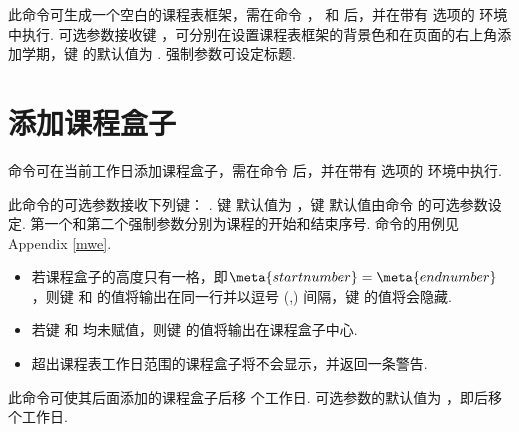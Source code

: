 \documentclass[letterpaper]{l3doc}
\begin{document}
\begin{function}{\maketable}
  \begin{syntax}
       
  \end{syntax}

  此命令可生成一个空白的课程表框架，需在命令 ， 和  后，并在带有  选项的  环境中执行. 可选参数接收键  ，可分别在设置课程表框架的背景色和在页面的右上角添加学期，键  的默认值为 . 强制参数可设定标题.
\end{function}

\section{添加课程盒子}

\begin{function}{\course}
  \begin{syntax}
         
  \end{syntax}

   命令可在当前工作日添加课程盒子，需在命令  后，并在带有  选项的  环境中执行.
  
  此命令的可选参数接收下列键：    . 键  默认值为 ，键  默认值由命令  的可选参数设定. 第一个和第二个强制参数分别为课程的开始和结束序号. 命令的用例见Appendix \ref{mwe}.
  
  \begin{itemize}
    \item 若课程盒子的高度只有一格，即$\meta{start number} = \meta{end number}$，则键  和  的值将输出在同一行并以逗号 (,) 间隔，键  的值将会隐藏.
    \item 若键  和  均未赋值，则键  的值将输出在课程盒子中心.
    \item 超出课程表工作日范围的课程盒子将不会显示，并返回一条警告.
  \end{itemize}
\end{function}

\begin{function}{\newday}
  \begin{syntax}
     
  \end{syntax}

  此命令可使其后面添加的课程盒子后移  个工作日. 可选参数的默认值为 ，即后移  个工作日.
\end{function}
\end{document}
